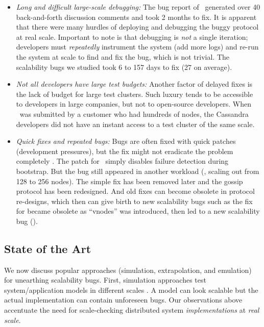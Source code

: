 \begin{itemize}
% 
\item {\em Long and difficult large-scale debugging:}
%
The bug report of \caone\ generated over 40 back-and-forth discussion
comments and took 2 months to fix.  It is apparent \cite{CA-One} that
there were many hurdles of deploying and debugging the buggy protocol at
real scale.  Important to note is that debugging is {\em not} a single
iteration; developers must {\em repeatedly} instrument the system (add
more logs) and re-run the system at scale to find and fix the bug, which
is not trivial.  The scalability bugs we studied took 6 to 157 days to
fix (27 on average).

\item {\em Not all developers have large test budgets:}
%
Another factor of delayed fixes is the lack of budget for large
test clusters.  Such luxury tends to be accessible to developers
in large companies, but not to
open-source developers.  When
\caone\ was submitted by a customer who had hundreds of nodes, the
Cassandra developers did not have an instant access to a test cluster of
the same scale.

\item {\em Quick fixes and repeated bugs:} Bugs are often fixed with quick
patches (development pressures), but the fix might not eradicate the problem
completely \cite{Yin+11-FixesBecomeBugs}.
%
The patch for \caone\ simply disables failure detection during bootstrap. But
the bug still appeared in another workload (\eg, scaling out from 128 to 256
nodes).
%
The simple fix has been removed later and the gossip protocol has been
redesigned.
%
And old fixes can become obsolete in protocol re-designs, which then can give
birth to new scalability bugs such as the fix for  became obsolete as
``vnodes'' was introduced, then led to a new scalability bug ().

\end{itemize}

\subsection{State of the Art}

We now discuss popular approaches (simulation, extrapolation, and emulation) for
unearthing scalability bugs.
First, simulation approaches test system/application models in different scales
\cite{Calotoiu+13-ApmScaleBug, Laguna+15-DebugAtScale}. A model can look
scalable but the actual implementation can contain unforeseen bugs. Our
observations above accentuate the need for scale-checking distributed system
{\em implementations} at {\em real scale}.

